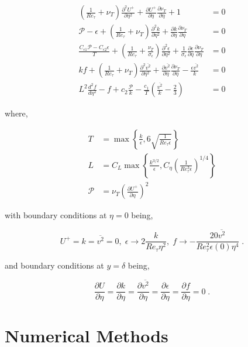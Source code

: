 \documentclass[12pt]{article}
\newcommand{\ep}{\epsilon} \newcommand{\noi}{\noindent}
\newcommand{\pr}{\partial}
\begin{document}
\begin{align}
	\label{eq:ndv2f1}
	\left( \frac{1}{Re_\tau} + \nu_T\right) \frac{\pr^2 U^+}{\pr \eta^2} +
	\frac{\pr U^+}{\pr \eta}
	\frac{\pr \nu_T}{\pr \eta} +1 &=0\\ 
	\mathcal{P} - \ep + \left( \frac{1}{Re_\tau}+ \nu_T \right) \frac{\pr^2
	k }{\pr \eta^2} + \frac{\pr k}{\pr \eta} \frac{\pr \nu_T}{\pr \eta} &=0\\
	\frac{C_{\ep 1 } \mathcal{P} - C_{\ep 2 } \ep}{T} + \left(
	\frac{1}{Re_\tau} + \frac{\nu_T}{ \sigma_\ep}
	\right) \frac{\pr^2 \ep}{\pr \eta^2 } + \frac{1}{\sigma_\ep}
	\frac{\pr \ep}{\pr \eta} \frac{\pr \nu_T}{\pr \eta} &= 0 \\
	kf + \left(\frac{1}{Re_\tau} + \nu_T\right) \frac{\pr^2
		\overline{v^2}}{\pr \eta^2} +
	\frac{\pr \overline{v^2}}{\pr \eta} \frac{\pr \nu_T}{\pr \eta} -
	\frac{\ep \overline{v^2}}{k} &= 0 \\
	L^2 \frac{d^2 f }{d\eta^2} - f + c_2 \frac{\mathcal{P}}{k} -
	\frac{c_1}{T} \left( \frac{\overline{v^2}}{k} - \frac{2}{3}\right) &=0
	\label{eq:ndv2f2}
\end{align}

\noi where, 

\begin{align*}
	T &= \max \left\{ \frac{k}{\ep}, 6 \sqrt{\frac{1}{Re_\tau \ep}} \right\}
	\\ 
	L &= C_L \max \left\{ \frac{k^{3/2}}{\ep}, C_\eta \left(
	\frac{1}{Re_\tau^3 \ep}
	\right)^{1/4} \right\} \\ 
	\mathcal{P} &= \nu_T \left( \frac{\pr U^+}{\pr \eta} \right)^2 
\end{align*}

\noi with boundary conditions at $\eta = 0$ being, 

\[ U^+ =  k =  \overline{v^2}= 0, \; \ep \to 2 \frac{k}{Re_\tau \eta^2}, \; f \to -
\frac{20\overline{v^2}}{Re_\tau^2 \ep(0) \eta^4}\; .\] 

\noi and boundary conditions at $y = \delta$ being, 

\[ \frac{\pr U}{\pr \eta} = \frac{\pr k}{\pr \eta} = \frac{\pr
	\overline{v^2}}{\pr \eta} = \frac{\pr \ep}{\pr \eta} = \frac{\pr f}{\pr
	\eta} = 0
\; . \]


\section{Numerical Methods} 

\end{document}
